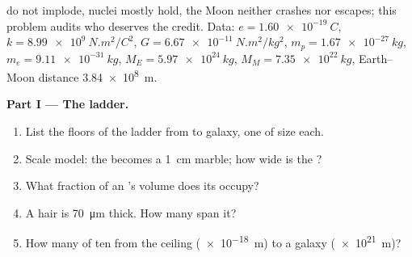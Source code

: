 \begin{problem}
\label{pb:g11:fundamental-interactions:1}
 do not implode, nuclei mostly hold, the Moon neither crashes nor
escapes; this problem audits who deserves the credit. Data:
$e = \qty{1.60e-19}{C}$,
$k = \qty{8.99e9}{N.m^2/C^2}$, $G = \qty{6.67e-11}{N.m^2/kg^2}$,
$m_p = \qty{1.67e-27}{kg}$, $m_e = \qty{9.11e-31}{kg}$,
$M_E = \qty{5.97e24}{kg}$, $M_M = \qty{7.35e22}{kg}$, Earth--Moon
distance \qty{3.84e8}{m}.

\medskip
\noindent\textbf{Part I --- The ladder.}
\begin{enumerate}
  \item List the floors of the ladder from  to galaxy, one  of size each.
  \item Scale model: the  becomes a \qty{1}{cm} marble; how wide
        is the ?
  \item What fraction of an 's volume does its  occupy?
  \item A hair is \qty{70}{\micro m} thick. How many  span it?
  \item How many  of ten from the  ceiling (\qty{e-18}{m})
        to a galaxy (\qty{e21}{m})?
\end{enumerate}


\end{problem}

